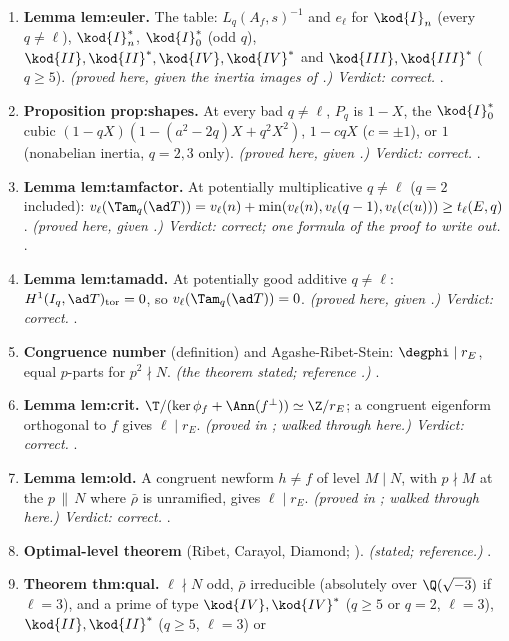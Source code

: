 \begin{sloppypar}
\begin{enumerate}[label=\textbf{\thechapter.\arabic*}]
\item \textbf{Lemma lem:euler.} The table: $L_q(A_f,s)^{-1}$ and $e_\ell$ for $\kod{I}_n$ (every $q\ne\ell$), $\kod{I}_n^*$, $\kod{I}_0^*$ (odd $q$), $\kod{II},\kod{II}^*,\kod{IV},\kod{IV}^*$ and $\kod{III},\kod{III}^*$ ($q\ge5$). \emph{(proved here,
given the inertia images of .) Verdict: correct.} .
\item \textbf{Proposition prop:shapes.} At every bad $q\ne\ell$, $P_q$ is $1-X$, the $\kod{I}_0^*$ cubic $(1-qX)(1-(a^2-2q)X+q^2X^2)$, $1-cqX$ ($c=\pm1$), or $1$ (nonabelian inertia, $q=2,3$ only).
\emph{(proved here, given .) Verdict: correct.} .
\item \textbf{Lemma lem:tamfactor.} At potentially multiplicative $q\ne\ell$ ($q=2$ included): $v_\ell(\Tam_q(\ad T))=v_\ell(n)+\min(v_\ell(n),v_\ell(q-1),v_\ell(c(u)))\ge t_\ell(E,q)$. \emph{(proved here, given
.) Verdict: correct; one formula of the proof to write out.} .
\item \textbf{Lemma lem:tamadd.} At potentially good additive $q\ne\ell$: $H^1(I_q,\ad T)_{\mathrm{tor}}=0$, so $v_\ell(\Tam_q(\ad T))=0$. \emph{(proved here, given .) Verdict: correct.}
.
\item \textbf{Congruence number} (definition) and Agashe-Ribet-Stein: $\degphi\mid r_E$, equal $p$-parts for $p^2\nmid N$. \emph{(the theorem stated; reference \cite[Theorem 2.2]{ARS12}.)}
.
\item \textbf{Lemma lem:crit.} $\T/(\ker\phi_f+\Ann(f^\perp))\simeq\Z/r_E$; a congruent eigenform orthogonal to $f$ gives $\ell\mid r_E$. \emph{(proved in ; walked through here.) Verdict:
correct.} .
\item \textbf{Lemma lem:old.} A congruent newform $h\ne f$ of level $M\mid N$, with $p\nmid M$ at the $p\,\|\,N$ where $\bar\rho$ is unramified, gives $\ell\mid r_E$. \emph{(proved in ; walked through
here.) Verdict: correct.} .
\item \textbf{Optimal-level theorem} (Ribet, Carayol, Diamond; \cite[Theorem 3.15]{DDT}). \emph{(stated; reference.)} .
\item \textbf{Theorem thm:qual.} $\ell\nmid N$ odd, $\bar\rho$ irreducible (absolutely over $\Q(\sqrt{-3})$ if $\ell=3$), and a prime of type $\kod{IV},\kod{IV}^*$ ($q\ge5$ or $q=2$, $\ell=3$), $\kod{II},\kod{II}^*$ ($q\ge5$, $\ell=3$) or

\end{enumerate}
\end{sloppypar}
